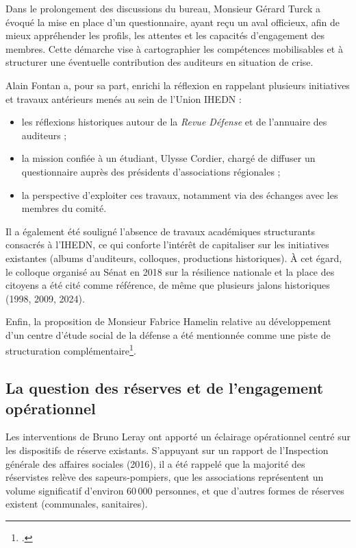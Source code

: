 \documentclass[12pt,a4paper]{article}
\begin{document}
Dans le prolongement des discussions du bureau, Monsieur Gérard Turck a évoqué la mise en place d'un questionnaire, ayant reçu un aval officieux, afin de mieux appréhender les profils, les attentes et les capacités d'engagement des membres. Cette démarche vise à cartographier les compétences mobilisables et à structurer une éventuelle contribution des auditeurs en situation de crise.

Alain Fontan a, pour sa part, enrichi la réflexion en rappelant plusieurs initiatives et travaux antérieurs menés au sein de l'Union IHEDN :
\begin{itemize}
    \item les réflexions historiques autour de la \textit{Revue Défense} et de l'annuaire des auditeurs ;
    \item la mission confiée à un étudiant, Ulysse Cordier, chargé de diffuser un questionnaire auprès des présidents d'associations régionales ;
    \item la perspective d'exploiter ces travaux, notamment via des échanges avec les membres du comité.
\end{itemize}

Il a également été souligné l'absence de travaux académiques structurants consacrés à l'IHEDN, ce qui conforte l'intérêt de capitaliser sur les initiatives existantes (albums d'auditeurs, colloques, productions historiques). À cet égard, le colloque organisé au Sénat en 2018 sur la résilience nationale et la place des citoyens a été cité comme référence, de même que plusieurs jalons historiques (1998, 2009, 2024).

Enfin, la proposition de Monsieur Fabrice Hamelin relative au développement d'un centre d'étude social de la défense a été mentionnée comme une piste de structuration complémentaire\footcite{hamelinIHEDN}.

\subsection{La question des réserves et de l'engagement opérationnel}

Les interventions de Bruno Leray ont apporté un éclairage opérationnel centré sur les dispositifs de réserve existants. S'appuyant sur un rapport de l'Inspection générale des affaires sociales (2016), il a été rappelé que la majorité des réservistes relève des sapeurs-pompiers, que les associations représentent un volume significatif d'environ 60\,000 personnes, et que d'autres formes de réserves existent (communales, sanitaires).
\end{document}
